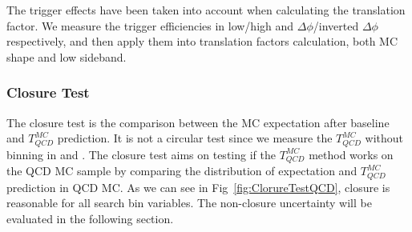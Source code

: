 The trigger effects have been taken into account when calculating the translation factor. We measure the trigger efficiencies in low/high \HT and $\Delta\phi$/inverted $\Delta\phi$ respectively, and then apply them into translation factors calculation, both MC shape and low \MET sideband.

\subsubsection{Closure Test}
The closure test is the comparison between the MC expectation after baseline and $T_{QCD}^{MC}$ prediction. It is not a circular test since we measure the $T_{QCD}^{MC}$ without binning in \ntops and \nbjets. 
The closure test aims on testing if the $T_{QCD}^{MC}$ method works on the QCD MC sample by comparing the distribution of expectation and $T_{QCD}^{MC}$ prediction in QCD MC.
As we can see in Fig~\ref{fig:ClorureTestQCD}, closure is reasonable for all search bin variables. The non-closure uncertainty will be evaluated in the following section.
